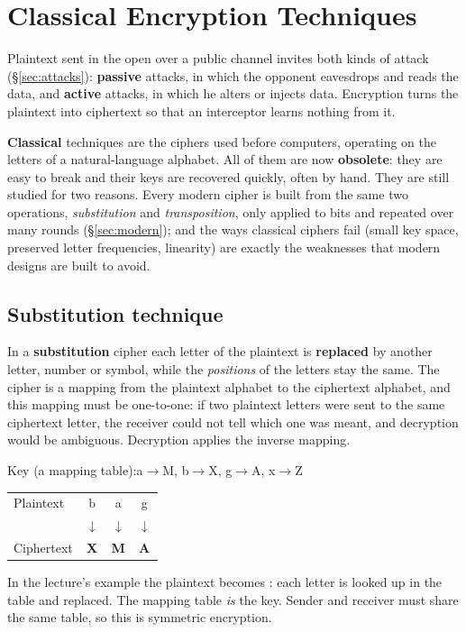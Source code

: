 \section{Classical Encryption Techniques}\label{sec:classical}

Plaintext sent in the open over a public channel invites both kinds of attack (\S\ref{sec:attacks}): \textbf{passive} attacks, in which the opponent eavesdrops and reads the data, and \textbf{active} attacks, in which he alters or injects data. Encryption turns the plaintext into ciphertext so that an interceptor learns nothing from it.

\textbf{Classical} techniques are the ciphers used before computers, operating on the letters of a natural-language alphabet. All of them are now \textbf{obsolete}: they are easy to break and their keys are recovered quickly, often by hand. They are still studied for two reasons. Every modern cipher is built from the same two operations, \emph{substitution} and \emph{transposition}, only applied to bits and repeated over many rounds (\S\ref{sec:modern}); and the ways classical ciphers fail (small key space, preserved letter frequencies, linearity) are exactly the weaknesses that modern designs are built to avoid.

\subsection{Substitution technique}
In a \textbf{substitution} cipher each letter of the plaintext is \textbf{replaced} by another letter, number or symbol, while the \emph{positions} of the letters stay the same. The cipher is a mapping from the plaintext alphabet to the ciphertext alphabet, and this mapping must be one-to-one: if two plaintext letters were sent to the same ciphertext letter, the receiver could not tell which one was meant, and decryption would be ambiguous. Decryption applies the inverse mapping.

\begin{minipage}[t]{0.48\textwidth}
Key (a mapping table):\quad a$\to$M,\; b$\to$X,\; g$\to$A,\; x$\to$Z\\[3pt]
\begin{tabular}{@{}lccc@{}}
Plaintext  & b & a & g \\
           & $\downarrow$ & $\downarrow$ & $\downarrow$ \\
Ciphertext & \textbf{X} & \textbf{M} & \textbf{A}
\end{tabular}
\end{minipage}\hfill
\begin{minipage}[t]{0.48\textwidth}
In the lecture's example the plaintext  becomes : each letter is looked up in the table and replaced. The mapping table \emph{is} the key. Sender and receiver must share the same table, so this is symmetric encryption.
\end{minipage}
\medskip

